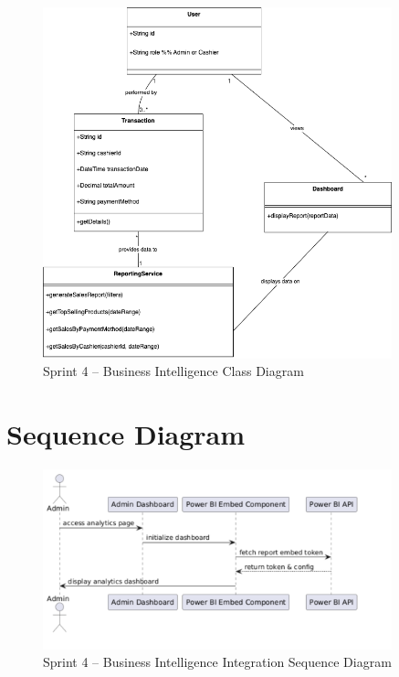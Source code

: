 \begin{figure}[H]
  \centering
  \includegraphics[width=0.9\textwidth]{figures/images/sprint4class.png}
  \caption{Sprint 4 – Business Intelligence Class Diagram}
  \label{fig:sprint4-class}
\end{figure}

\section{Sequence Diagram}

\begin{figure}[H]
  \centering
  \includegraphics[width=0.9\textwidth]{figures/images/sprint4sequence.png}
  \caption{Sprint 4 – Business Intelligence Integration Sequence Diagram}
  \label{fig:sprint4-sequence}
\end{figure}


